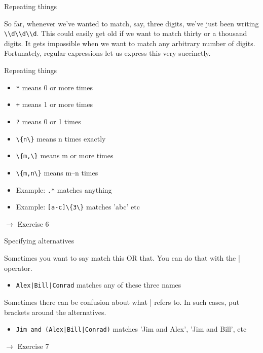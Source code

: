 \documentclass{beamer}
\begin{document}
\begin{frame}{Repeating things}

So far, whenever we've wanted to match, say, three digits, we've just been writing
\lstinline$\\d\\d\\d$. This could easily get old if we want to match thirty or a thousand digits.
It gets impossible when we want to match any arbitrary number of digits.
Fortunately, regular expressions let us express this very succinctly.

\end{frame}

\begin{frame}{Repeating things}

\begin{itemize}
 \item \lstinline$*$ means 0 or more times
 \item \lstinline$+$ means 1 or more times
 \item \lstinline$?$ means 0 or 1 times
 \item \lstinline$\{n\}$ means n times exactly
 \item \lstinline$\{m,\}$ means m or more times
 \item \lstinline$\{m,n\}$ means m--n times
 \item Example: \lstinline$.*$ matches anything
 \item Example: \lstinline$[a-c]\{3\}$ matches 'abc' etc
\end{itemize}

\bigskip
$\rightarrow$ Exercise 6

\end{frame}

\begin{frame}{Specifying alternatives}

Sometimes you want to say match this OR that.
You can do that with the | operator.

\begin{itemize}
  \item \lstinline$Alex|Bill|Conrad$ matches any of these three names
\end{itemize}

Sometimes there can be confusion about what | refers to.
In such cases, put brackets around the alternatives.

\begin{itemize}
  \item \lstinline$Jim and (Alex|Bill|Conrad)$ matches 'Jim and Alex', 'Jim and Bill', etc
\end{itemize}

\bigskip
$\rightarrow$ Exercise 7

\end{frame}
\end{document}
